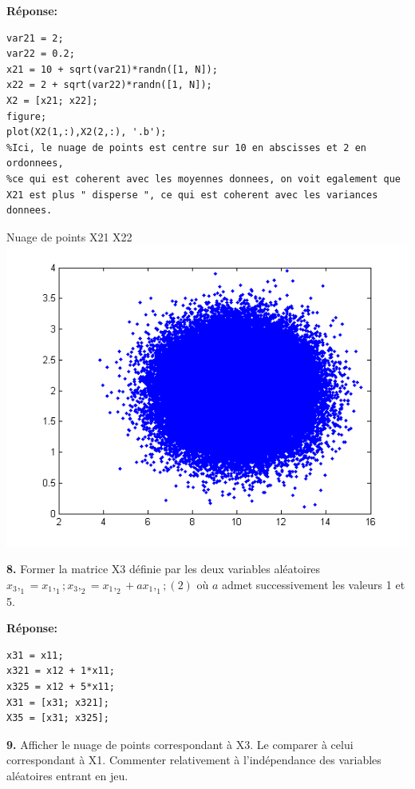 \documentclass[12pt]{article}
\begin{document}
\smallbreak
\textbf{Réponse:}
\begin{lstlisting}[style=Matlab-editor]
var21 = 2;
var22 = 0.2;
x21 = 10 + sqrt(var21)*randn([1, N]);
x22 = 2 + sqrt(var22)*randn([1, N]);
X2 = [x21; x22];
figure;
plot(X2(1,:),X2(2,:), '.b');
%Ici, le nuage de points est centre sur 10 en abscisses et 2 en ordonnees,
%ce qui est coherent avec les moyennes donnees, on voit egalement que X21 est plus " disperse ", ce qui est coherent avec les variances donnees.
\end{lstlisting}

\begin{flushleft}
 Nuage de points X21 X22
\includegraphics{2_7_10000.PNG}
\end{flushleft}
						


\smallbreak

\textbf{8. }Former la matrice X3 définie par les deux variables aléatoires
$
x_3,_1 = x_1,_1 ; x_3,_2 = x_1,_2 + a x_1,_1;
(2)
$
où $a$ admet successivement les valeurs 1 et 5.

\smallbreak
\textbf{Réponse:}
\begin{lstlisting}[style=Matlab-editor]
x31 = x11;
x321 = x12 + 1*x11;
x325 = x12 + 5*x11;
X31 = [x31; x321];
X35 = [x31; x325];
\end{lstlisting}

\smallbreak

\textbf{9.} Afficher le nuage de points correspondant à X3. Le comparer à celui correspondant à X1. Commenter relativement à l'indépendance des variables aléatoires entrant en jeu.
\end{document}
